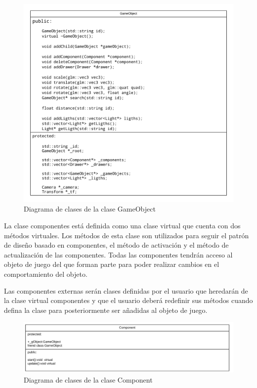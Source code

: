 \documentclass[a4paper, 17pt]{book}
\begin{document}
\begin{figure}[hbt!]
    \centering
    \includegraphics[scale=0.3, keepaspectratio]{img/GameObject.png}
    \caption{Diagrama de clases de la clase GameObject}
    \label{figura:GameObject}
\end{figure}

La clase componentes está definida como una clase virtual que cuenta con dos métodos virtuales. Los métodos de esta clase son utilizados
para seguir el patrón de diseño basado en componentes, el método de activación y el método de actualización de las componentes. Todas
las componentes tendrán acceso al objeto de juego del que forman parte para poder realizar cambios en el comportamiento del objeto.

Las componentes externas serán clases definidas por el usuario que heredarán de la clase virtual componentes y que el usuario deberá
redefinir sus métodos cuando defina la clase para posteriormente ser añadidas al objeto de juego.

\begin{figure}[hbt!]
    \centering
    \includegraphics[scale=0.3, keepaspectratio]{img/Component.png}
    \caption{Diagrama de clases de la clase Component}
    \label{figura:Component}
\end{figure}
\end{document}
